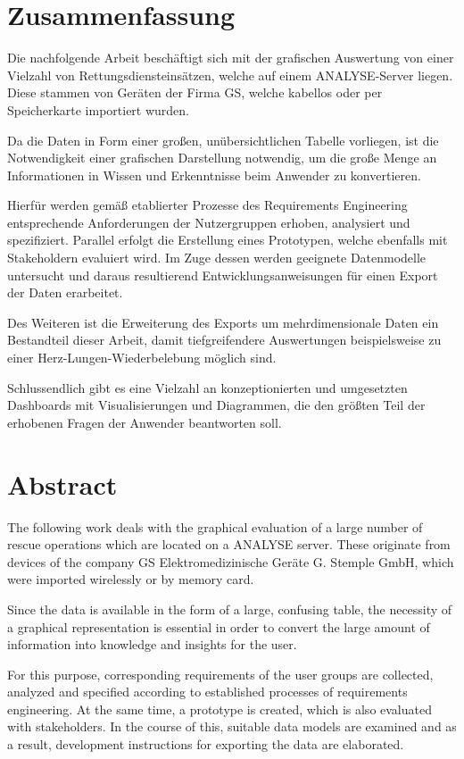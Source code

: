\newpage\thispagestyle{empty}
\section*{Zusammenfassung}

Die nachfolgende Arbeit beschäftigt sich mit der grafischen Auswertung von einer Vielzahl von Rettungsdiensteinsätzen, welche auf einem \acrlong{ANALYSE}-Server liegen.
Diese stammen von Geräten der Firma \acrlong{GS}, welche kabellos oder per Speicherkarte importiert wurden.

Da die Daten in Form einer großen, unübersichtlichen Tabelle vorliegen, ist die Notwendigkeit einer grafischen Darstellung notwendig, um die große Menge an Informationen in Wissen und Erkenntnisse beim Anwender zu konvertieren.

Hierfür werden gemäß etablierter Prozesse des Requirements Engineering entsprechende Anforderungen der Nutzergruppen erhoben, analysiert und spezifiziert.
Parallel erfolgt die Erstellung eines Prototypen, welche ebenfalls mit Stakeholdern evaluiert wird.
Im Zuge dessen werden geeignete Datenmodelle untersucht und daraus resultierend Entwicklungsanweisungen für einen Export der Daten erarbeitet.

Des Weiteren ist die Erweiterung des Exports um mehrdimensionale Daten ein Bestandteil dieser Arbeit, damit tiefgreifendere Auswertungen beispielsweise zu einer Herz-Lungen-Wiederbelebung möglich sind.

Schlussendlich gibt es eine Vielzahl an konzeptionierten und umgesetzten Dashboards mit Visualisierungen und Diagrammen, die den größten Teil der erhobenen Fragen der Anwender beantworten soll.

\section*{Abstract}
The following work deals with the graphical evaluation of a large number of
rescue operations which are located on a \acrlong{ANALYSE} server.
These originate from devices of the company GS Elektromedizinische Geräte G. Stemple GmbH, which were imported wirelessly or by memory card.

Since the data is available in the form of a large, confusing table, the necessity of a graphical representation is essential in order to convert the large amount of information into knowledge and insights for the user.

For this purpose, corresponding requirements of the user groups are collected, analyzed and specified according to established processes of requirements engineering.
At the same time, a prototype is created, which is also evaluated with stakeholders.
In the course of this, suitable data models are examined and as a result, development instructions for exporting the data are elaborated.

